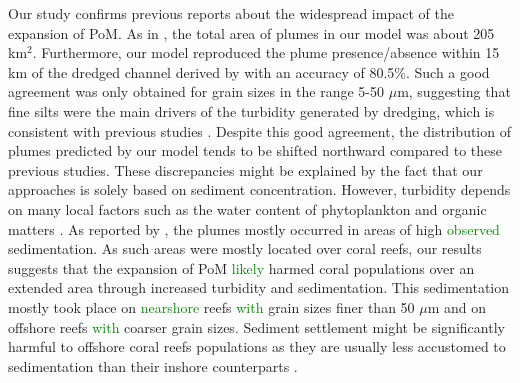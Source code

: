 \documentclass[preprint,12pt,authoryear]{elsarticle}
\newcommand{\modif}[1]{\textcolor{green}{#1}}
\begin{document}
Our study confirms previous reports about the widespread impact of the expansion of PoM. As in \cite{barnes2015sediment}, the total area of plumes in our model was about 205 km$^2$. Furthermore, our model reproduced the plume presence/absence within 15 km of the dredged channel derived by \cite{cunning2019extensive} with an accuracy of 80.5\%. Such a good agreement was only obtained for grain sizes in the range 5-50 $\mu$m, suggesting that fine silts were the main drivers of the turbidity generated by dredging, which is consistent with previous studies \citep{storlazzi2015influence,fourney2017additive}. Despite this good agreement, the distribution of plumes predicted by our model tends to be shifted northward compared to these previous studies. These discrepancies might be explained by the fact that our approaches is solely based on sediment concentration. However, turbidity depends on many local factors such as the water content of phytoplankton and organic matters \citep{gray2000comparability,thackston2000improved}. As reported by \cite{cunning2019extensive}, the plumes mostly occurred in areas of high \modif{observed} sedimentation. As such areas were mostly located over coral reefs, our results suggests that the expansion of PoM \modif{likely} harmed coral populations over an extended area through increased turbidity and sedimentation. This sedimentation mostly took place on \modif{nearshore} reefs \modif{with} grain sizes finer than 50 $\mu$m and on offshore reefs \modif{with} coarser grain sizes. Sediment settlement might be significantly harmful to offshore coral reefs populations as they are usually less accustomed to sedimentation than their inshore  counterparts \citep{wolanski2005fine}.
\end{document}
